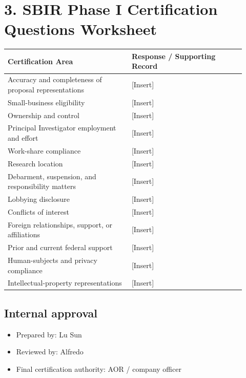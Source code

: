 \documentclass[11pt,letterpaper]{article}
\begin{document}
\section*{3. SBIR Phase I Certification Questions Worksheet}

\begin{longtable}{p{0.48\linewidth}p{0.44\linewidth}}
\textbf{Certification Area} & \textbf{Response / Supporting Record} \\
\hline
Accuracy and completeness of proposal representations & [Insert] \\
Small-business eligibility & [Insert] \\
Ownership and control & [Insert] \\
Principal Investigator employment and effort & [Insert] \\
Work-share compliance & [Insert] \\
Research location & [Insert] \\
Debarment, suspension, and responsibility matters & [Insert] \\
Lobbying disclosure & [Insert] \\
Conflicts of interest & [Insert] \\
Foreign relationships, support, or affiliations & [Insert] \\
Prior and current federal support & [Insert] \\
Human-subjects and privacy compliance & [Insert] \\
Intellectual-property representations & [Insert] \\
\end{longtable}

\subsection*{Internal approval}
\begin{itemize}
\item Prepared by: Lu Sun
\item Reviewed by: Alfredo
\item Final certification authority: AOR / company officer
\end{itemize}
\end{document}
